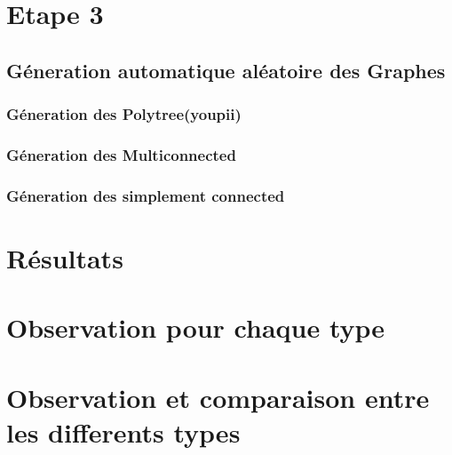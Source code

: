 \documentclass[12pt,a4paper,oneside]{book}
\begin{document}
    \section{Etape 3}
    \subsection{Géneration automatique aléatoire des Graphes}
    \subsubsection{Géneration des Polytree(youpii)}
    \subsubsection{Géneration des Multiconnected}
    \subsubsection{Géneration des simplement connected}
    \section{Résultats}
    
    \section{Observation pour chaque type }
    \section{Observation et comparaison entre les differents types}
\end{document}
